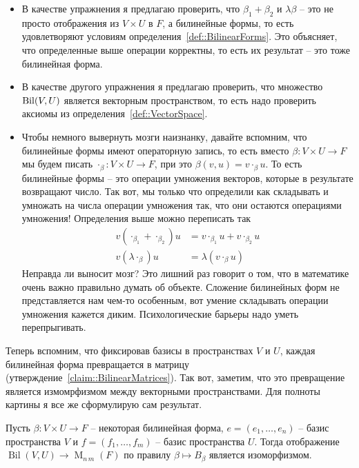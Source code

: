 \begin{itemize}
\item В качестве упражнения я предлагаю проверить, что $\beta_1 + \beta_2$ и $\lambda\beta$ -- это не просто отображения из $V\times U$ в $F$, а билинейные формы, то есть удовлетворяют условиям определения~\ref{def::BilinearForms}.
Это объясняет, что определенные выше операции корректны, то есть их результат -- это тоже билинейная форма.

\item В качестве другого упражнения я предлагаю проверить, что множество $\operatorname{Bil}(V, U)$ является векторным пространством, то есть надо проверить аксиомы из определения~\ref{def::VectorSpace}.

\item Чтобы немного вывернуть мозги наизнанку, давайте вспомним, что билинейные формы имеют операторную запись, то есть вместо $\beta\colon V\times U\to F$ мы будем писать $\cdot_\beta\colon V\times U \to F$, при это $\beta(v, u) = v \cdot_\beta u$.
То есть билинейные формы -- это операции умножения векторов, которые в результате возвращают число.
Так вот, мы только что определили как складывать и умножать на числа операции умножения так, что они остаются операциями умножения!
Определения выше можно переписать так
\begin{align*}
v (\cdot_{\beta_1} + \cdot_{\beta_2}) u &= v \cdot_{\beta_1} u + v \cdot_{\beta_2} u\\
v(\lambda \cdot_\beta) u &= \lambda (v \cdot_\beta u)
\end{align*}
Неправда ли выносит мозг?
Это лишний раз говорит о том, что в математике очень важно правильно думать об объекте.
Сложение билинейных форм не представляется нам чем-то особенным, вот умение складывать операции умножения кажется диким.
Психологические барьеры надо уметь перепрыгивать.
\end{itemize}

Теперь вспомним, что фиксировав базисы в пространствах $V$ и $U$, каждая билинейная форма превращается в матрицу (утверждение~\ref{claim::BilinearMatrices}).
Так вот, заметим, что это превращение является измомрфизмом между векторными пространствами.
Для полноты картины я все же сформулирую сам результат.

\begin{claim}
Пусть $\beta\colon V\times U\to F$ -- некоторая билинейная форма,  $e = (e_1,\ldots,e_n)$ -- базис пространства $V$ и $f=(f_1,\ldots,f_m)$ -- базис пространства $U$.
Тогда отображение $\operatorname{Bil}(V,U)\to \operatorname{M}_{n\,m}(F)$ по правилу $\beta\mapsto B_\beta$ является изоморфизмом.
\end{claim}

